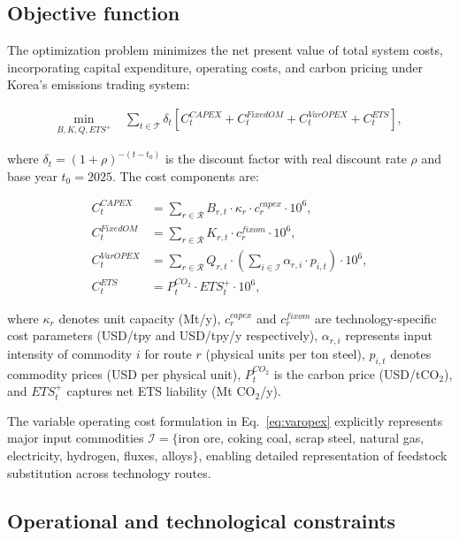 \documentclass[preprint,1p,authoryear]{elsarticle}
\begin{document}
\subsection{Objective function}

The optimization problem minimizes the net present value of total system costs, incorporating capital expenditure, operating costs, and carbon pricing under Korea's emissions trading system:

\begin{align}
\min_{B,K,Q,ETS^+} \; & \sum_{t \in \mathcal{T}} \delta_t \left[ C^{CAPEX}_t + C^{FixedOM}_t + C^{VarOPEX}_t + C^{ETS}_t \right],
\end{align}

where $\delta_t = (1+\rho)^{-(t-t_0)}$ is the discount factor with real discount rate $\rho$ and base year $t_0 = 2025$. The cost components are:

\begin{align}
C^{CAPEX}_t &= \sum_{r \in \mathcal{R}} B_{r,t} \cdot \kappa_r \cdot c^{capex}_r \cdot 10^6, \label{eq:capex}\\
C^{FixedOM}_t &= \sum_{r \in \mathcal{R}} K_{r,t} \cdot c^{fixom}_r \cdot 10^6, \label{eq:fixom}\\
C^{VarOPEX}_t &= \sum_{r \in \mathcal{R}} Q_{r,t} \cdot \left( \sum_{i \in \mathcal{I}} \alpha_{r,i} \cdot p_{i,t} \right) \cdot 10^6, \label{eq:varopex}\\
C^{ETS}_t &= P^{CO_2}_t \cdot ETS_t^+ \cdot 10^6, \label{eq:ets}
\end{align}

where $\kappa_r$ denotes unit capacity (Mt/y), $c^{capex}_r$ and $c^{fixom}_r$ are technology-specific cost parameters (USD/tpy and USD/tpy/y respectively), $\alpha_{r,i}$ represents input intensity of commodity $i$ for route $r$ (physical units per ton steel), $p_{i,t}$ denotes commodity prices (USD per physical unit), $P^{CO_2}_t$ is the carbon price (USD/tCO$_2$), and $ETS_t^+$ captures net ETS liability (Mt CO$_2$/y).

The variable operating cost formulation in Eq.~\eqref{eq:varopex} explicitly represents major input commodities $\mathcal{I} = \{$iron ore, coking coal, scrap steel, natural gas, electricity, hydrogen, fluxes, alloys$\}$, enabling detailed representation of feedstock substitution across technology routes.

\subsection{Operational and technological constraints}
\end{document}
